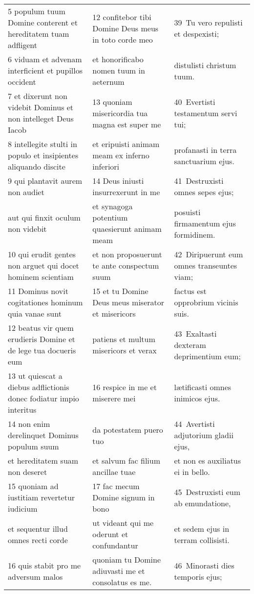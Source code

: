 \documentclass{article}
\begin{document}
\begin{longtable}{@{}p{}p{}p{}@{}}
5 populum tuum Domine conterent et hereditatem tuam adfligent	&	12 confitebor tibi Domine Deus meus in toto corde meo	&	39 Tu vero repulisti et despexisti;	\\
6 viduam et advenam interficient et pupillos occident	&	et honorificabo nomen tuum in aeternum	&	distulisti christum tuum.	\\
7 et dixerunt non videbit Dominus et non intelleget Deus Iacob	&	13 quoniam misericordia tua magna est super me	&	40 Evertisti testamentum servi tui;	\\
8 intellegite stulti in populo et insipientes aliquando discite	&	et eripuisti animam meam ex inferno inferiori	&	profanasti in terra sanctuarium ejus.	\\
9 qui plantavit aurem non audiet	&	14 Deus iniusti insurrexerunt in me	&	41 Destruxisti omnes sepes ejus;	\\
aut qui finxit oculum non videbit	&	et synagoga potentium quaesierunt animam meam	&	posuisti firmamentum ejus formidinem.	\\
10 qui erudit gentes non arguet qui docet hominem scientiam	&	et non proposuerunt te ante conspectum suum	&	42 Diripuerunt eum omnes transeuntes viam;	\\
11 Dominus novit cogitationes hominum quia vanae sunt	&	15 et tu Domine Deus meus miserator et misericors	&	factus est opprobrium vicinis suis.	\\
12 beatus vir quem erudieris Domine et de lege tua docueris eum	&	patiens et multum misericors et verax	&	43 Exaltasti dexteram deprimentium eum;	\\
13 ut quiescat a diebus adflictionis donec fodiatur impio interitus	&	16 respice in me et miserere mei	&	lætificasti omnes inimicos ejus.	\\
14 non enim derelinquet Dominus populum suum	&	da potestatem puero tuo	&	44 Avertisti adjutorium gladii ejus,	\\
et hereditatem suam non deseret	&	et salvum fac filium ancillae tuae	&	et non es auxiliatus ei in bello.	\\
15 quoniam ad iustitiam revertetur iudicium	&	17 fac mecum Domine signum in bono	&	45 Destruxisti eum ab emundatione,	\\
et sequentur illud omnes recti corde	&	ut videant qui me oderunt et confundantur	&	et sedem ejus in terram collisisti.	\\
16 quis stabit pro me adversum malos	&	quoniam tu Domine adiuvasti me et consolatus es me.	&	46 Minorasti dies temporis ejus;	\\

\end{longtable}
\end{document}
